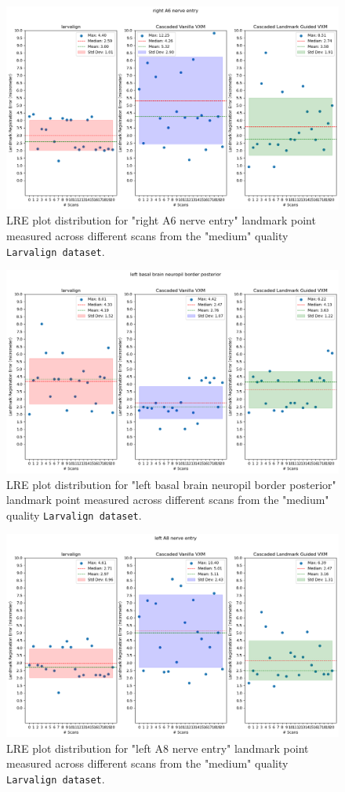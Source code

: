 	\begin{figure}[h!]
		\centering
		\includegraphics[width=0.75\columnwidth]{resources/chapter5_fresh/output/right A6 nerve entry.png}
		\caption{LRE plot distribution for "right A6 nerve entry" landmark point measured across different scans from the "medium" quality \texttt{Larvalign dataset}.}
		\label{fig:landmark24}
	\end{figure}

	\begin{figure}[h!]
		\centering
		\includegraphics[width=0.75\columnwidth]{resources/chapter5_fresh/output/left basal brain neuropil border posterior.png}
		\caption{LRE plot distribution for "left basal brain neuropil border posterior" landmark point measured across different scans from the "medium" quality \texttt{Larvalign dataset}.}
		\label{fig:landmark25}
	\end{figure}

	\begin{figure}[h!]
		\centering
		\includegraphics[width=0.75\columnwidth]{resources/chapter5_fresh/output/left A8 nerve entry.png}
		\caption{LRE plot distribution for "left A8 nerve entry" landmark point measured across different scans from the "medium" quality \texttt{Larvalign dataset}.}
		\label{fig:landmark26}
	\end{figure}

